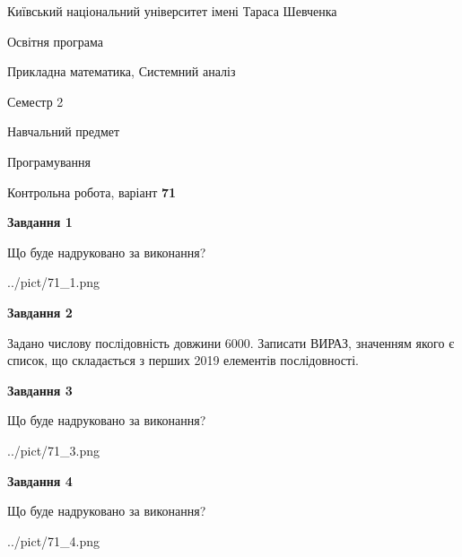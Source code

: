 \documentclass[12pt, ukrainian]{article}
\begin{document}
{{\begin {small}\par
{ \center  Київський національний університет імені Тараса Шевченка \par}
{\parbox {5 cm}{Освітня програма \hfill}{\parbox {8 cm}{Прикладна математика, Системний аналіз \hfill}}\parbox {5 cm}{\hfill Семестр 2}}\par
{\parbox {5 cm} {Навчальний предмет \hfill}\parbox {7 cm}{Програмування \hfill}\parbox {6cm}{\hfill}\par}\vspace{-7pt} \end{small}}{\center Контрольна робота, варіант  \No \textbf
{ 71 }\par}}
{
\begin {large}
{\begin {center}\textbf{Завдання 1}\end {center}}\par
Що буде надруковано за виконання?\par\par
\begin{center}
	{../pict/71_1.png}
\end{center}
\newpage

{\begin {center}\textbf{Завдання 2}\end {center}}\par

 Задано числову послідовність  довжини 6000. Записати ВИРАЗ, значенням якого є список, що складається з перших 2019 елементів послідовності.\par
\newpage

{\begin {center}\textbf{Завдання 3}\end {center}}\par
Що буде надруковано за виконання?
\begin{center}
	{../pict/71_3.png}
\end{center}
\newpage

{\begin {center}\textbf{Завдання 4}\end {center}}\par
Що буде надруковано за виконання?\par
\begin{center}
	{../pict/71_4.png}
\end{center}
\newpage


\end{large}}
\end{document}
